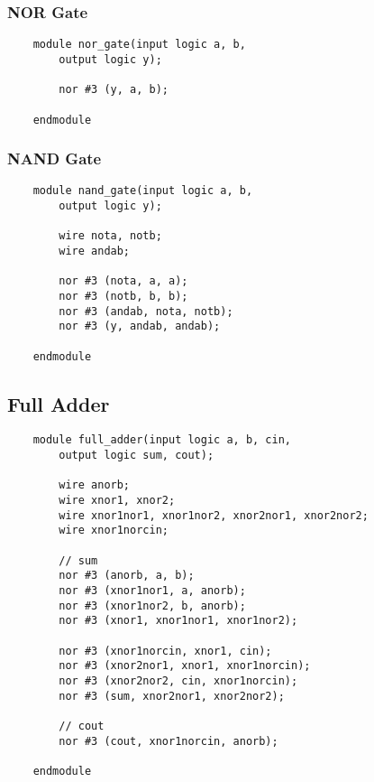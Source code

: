 \documentclass[../main]{subfiles}
\begin{document}
\subsubsection {NOR Gate}

\begin{verbatim}
    module nor_gate(input logic a, b,
        output logic y);

        nor #3 (y, a, b);

    endmodule
\end{verbatim}

\subsubsection {NAND Gate}

\begin{verbatim}
    module nand_gate(input logic a, b,
        output logic y);

        wire nota, notb;
        wire andab;

        nor #3 (nota, a, a);
        nor #3 (notb, b, b);
        nor #3 (andab, nota, notb);
        nor #3 (y, andab, andab);

    endmodule

\end{verbatim}

\subsection {Full Adder}

\begin{verbatim}
    module full_adder(input logic a, b, cin,
        output logic sum, cout);

        wire anorb;
        wire xnor1, xnor2;
        wire xnor1nor1, xnor1nor2, xnor2nor1, xnor2nor2;
        wire xnor1norcin;

        // sum
        nor #3 (anorb, a, b);
        nor #3 (xnor1nor1, a, anorb);
        nor #3 (xnor1nor2, b, anorb);
        nor #3 (xnor1, xnor1nor1, xnor1nor2);

        nor #3 (xnor1norcin, xnor1, cin);
        nor #3 (xnor2nor1, xnor1, xnor1norcin);
        nor #3 (xnor2nor2, cin, xnor1norcin);
        nor #3 (sum, xnor2nor1, xnor2nor2);

        // cout
        nor #3 (cout, xnor1norcin, anorb);

    endmodule
\end{verbatim}
\end{document}

